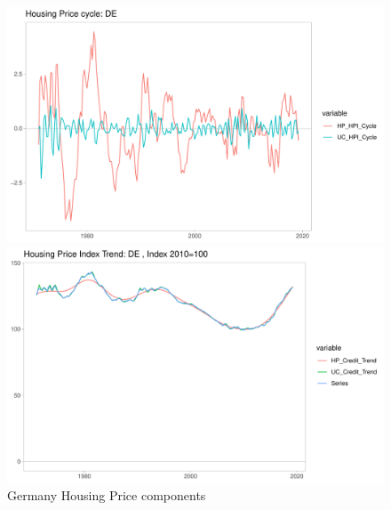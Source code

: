 \documentclass[fleqn]{article}
\begin{document}
\begin{outline}[enumerate]
\begin{figure}[h!]
	\caption{Germany Housing Price components}	
	\centerline{\includegraphics[scale=0.7]{../Output/Graphs/HP_cycle_DE.pdf}}
	\centerline{\includegraphics[scale=0.7]{../Output/Graphs/HP_trend_DE.pdf}}
\end{figure}



\end{outline}
\end{document}
